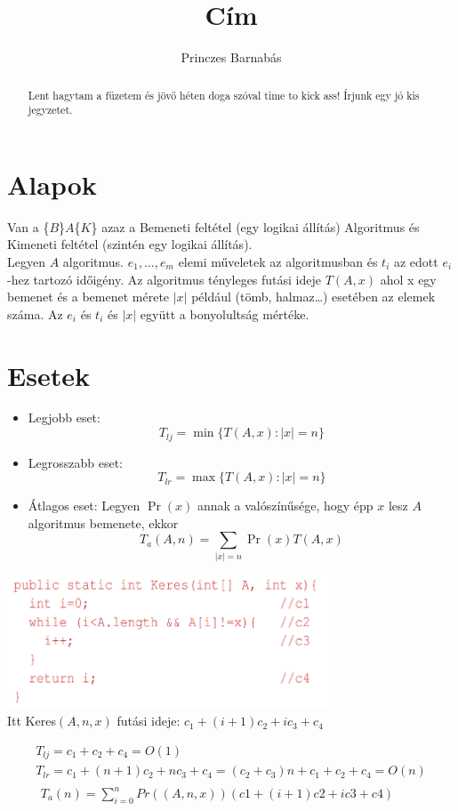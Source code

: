 \documentclass{article}
\title{Cím}
\author{Princzes
Barnabás}
\theoremstyle{mytheoremstyle}
\theoremstyle{mytheoremstyle}
\theoremstyle{myproblemstyle}
\begin{document}
\maketitle
\begin{abstract}
	Lent hagytam a füzetem és jövő héten doga szóval time to kick ass!
	Írjunk egy jó kis jegyzetet.
\end{abstract}
\section{Alapok}
Van a \{$B$\}$A$\{$K$\} azaz a Bemeneti
feltétel (egy logikai állítás) Algoritmus és Kimeneti feltétel
(szintén egy logikai állítás).
\\
Legyen $A$ algoritmus. $e_1,\ldots,e_m$ elemi műveletek az algoritmusban
és $t_i$ az edott $e_i$-hez tartozó időigény. Az algoritmus tényleges futási ideje
$T(A,x)$ ahol x egy bemenet és a bemenet mérete $|x|$ például
(tömb, halmaz\ldots) esetében az elemek száma.
Az $e_i$ és $t_i$ és $|x|$ együtt a bonyolultság mértéke.

\newpage

\section{Esetek}
\begin{itemize}
	\item Legjobb eset: \[T_{lj} = \min \{T(A,x):|x|=n\}\]
	\item Legrosszabb eset: \[T_{lr} = \max\{T(A,x):|x|=n\}\]
	\item Átlagos eset: Legyen $\Pr(x)$ annak
	      a valószínűsége, hogy épp $x$ lesz
	      $A$ algoritmus bemenete, ekkor
	      \\ \[T_a(A,n) = \sum_{|x|=n}\Pr(x)T(A,x)\]
\end{itemize}
\begin{center}
	\includegraphics[height=4cm]{keres}
	\\
	Itt Keres$(A,n,x)$ futási ideje: $c_1+(i+1)c_2+ic_3+c_4$
\end{center}

\begin{fleqn}
    \begin{equation*}
        \begin{multlined}
        T_{lj} = c_1+c_2+c_4 = O(1)\\
        T_{lr} = c_1+(n+1)c_2+nc_3+c_4=(c_2+c_3)n+c_1+c_2+c_4=O(n)\\
            \begin{split}
                T_a(n) = \sum_{i=0}^n  Pr((A,n,x))(c1 + (i+1)c2 +ic3 +c4)
            \end{split}
        \end{multlined}
    \end{equation*}
\end{fleqn}
\end{document}

